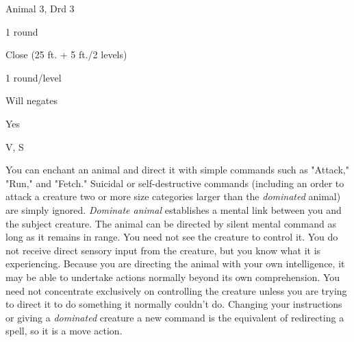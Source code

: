 
\begin{description*}
\item[Level:] Animal 3, Drd 3
\item[Casting Time:] 1 round
\item[Range:] Close (25 ft. + 5 ft./2 levels)
\item[Duration:] 1 round/level
\item[Saving Throw:] Will negates
\item[Spell Resistance:] Yes
\item[Components:] V, S
\end{description*}

You can enchant an animal and direct it with simple commands such as "Attack,"
"Run," and "Fetch." Suicidal or self-destructive commands (including an order
to attack a creature two or more size categories larger than the \textit{dominated
}animal) are simply ignored.
\textit{Dominate animal} establishes a mental link between you and the subject
creature. The animal can be directed by silent mental command as long as it remains
in range. You need not see the creature to control it. You do not receive direct
sensory input from the creature, but you know what it is experiencing. Because
you are directing the animal with your own intelligence, it may be able to undertake
actions normally beyond its own comprehension. You need not concentrate exclusively
on controlling the creature unless you are trying to direct it to do something
it normally couldn't do. Changing your instructions or giving a \textit{dominated
}creature a new command is the equivalent of redirecting a spell, so it is a move
action.